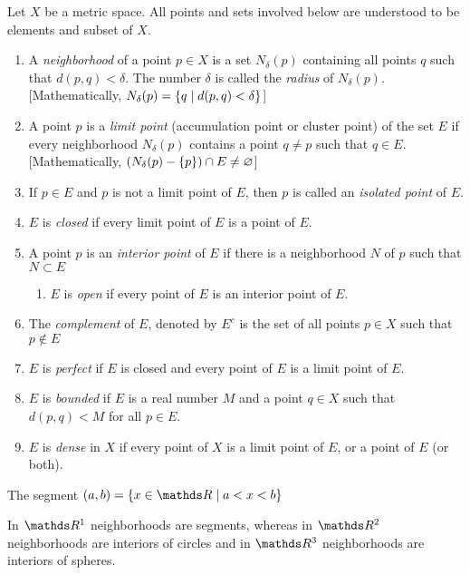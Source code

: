 \documentclass[../main-sheet.tex]{subfiles}
\begin{document}
\begin{defn}
    Let $ X $ be a metric space. All points and sets involved below are understood to be elements and subset of $ X $.
    \begin{enumerate}
        \item A \emph{neighborhood} of a point $ p\in X $ is a set $ N_\delta(p) $ containing all points $ q $ such that $ d(p,q)<\delta $. The number $ \delta $ is called the \emph{radius} of $ N_\delta(p) $. [Mathematically, $ N_\delta(p) =\left\{q\mid d(p,q)<\delta\right\}$]
        \item A point $ p $ is a \emph{limit point} (accumulation point or cluster point) of the set $ E $ if every neighborhood $ N_\delta(p) $ contains a point $ q\neq p $ such that $ q\in E $. [Mathematically, $ (N_\delta(p)-\left\{p\right\})\cap E\neq \varnothing $]
        \item If $ p\in E $ and $ p $ is not a limit point of $ E $, then $ p $ is called an \emph{isolated point} of $ E $.
        \item $ E $ is \emph{closed} if every limit point of $ E $ is a point of $ E $.
        \item A point $ p $ is an \emph{interior point} of $ E $ if there is a neighborhood $ N $ of $ p $ such that $ N\subset E $
        \begin{enumerate}[label=(\roman*)]
            \item $ E $ is \emph{open} if every point of $ E $ is an interior point of $ E $.
        \end{enumerate}
        \item The \emph{complement} of $ E $, denoted by $ E^c $ is the set of all points $ p\in X $ such that $ p \notin E $
        \item $ E $ is \emph{perfect} if $ E $ is closed and every point of $ E $ is a limit point of $E $.
        \item $ E $ is \emph{bounded} if $ E $ is a real number $ M $ and a point $ q\in X $ such that $ d(p,q)<M $ for all $ p\in E $.
        \item $ E $ is \emph{dense} in $ X $ if every point of $ X $ is a limit point of $ E $, or a point of $ E $ (or both).
    \end{enumerate}
\end{defn}
\begin{note}
    The segment $ (a,b)=\set{x\in\R\mid a<x<b} $
\end{note}
\begin{note}
    In $ \R^1 $ neighborhoods are segments, whereas in $ \R^2 $ neighborhoods are interiors of circles and in $ \R^3 $ neighborhoods are interiors of spheres.
\end{note}
\end{document}
